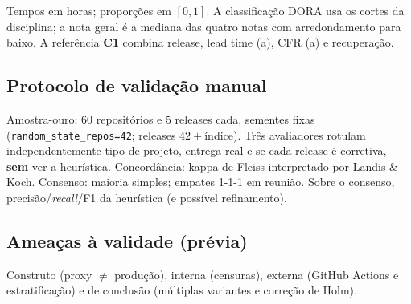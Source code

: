Tempos em horas; proporções em $[0,1]$. A classificação DORA usa os cortes da
disciplina; a nota geral é a mediana das quatro notas com arredondamento para
baixo. A referência \textbf{C1} combina release, lead time (a), CFR (a) e
recuperação.

\subsection{Protocolo de validação manual}

Amostra-ouro: 60 repositórios e 5 releases cada, sementes fixas
(\texttt{random\_state\_repos=42}; releases $42+$índice). Três avaliadores
rotulam independentemente tipo de projeto, entrega real e se cada release é
corretiva, \textbf{sem} ver a heurística. Concordância: kappa de Fleiss
interpretado por Landis \& Koch. Consenso: maioria simples; empates 1-1-1 em
reunião. Sobre o consenso, precisão/\textit{recall}/F1 da heurística (e
possível refinamento).

\subsection{Ameaças à validade (prévia)}

Construto (proxy $\neq$ produção), interna (censuras), externa (GitHub Actions
e estratificação) e de conclusão (múltiplas variantes e correção de Holm).
